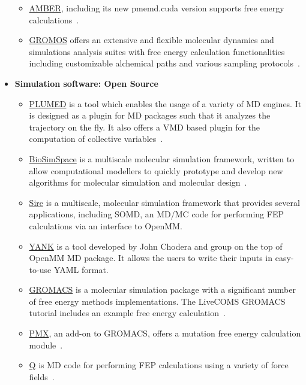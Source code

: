 \documentclass[9pt,bestpractices,pubversion]{livecoms}
\begin{document}
\begin{itemize}
\begin{itemize}
	\item \href{https://ambermd.org/}{AMBER}, including its new pmemd.cuda version supports free energy calculations~\cite{salomon-ferrer2013overview}. 
	\item \href{http://www.gromos.net/}{GROMOS} offers an extensive and flexible molecular dynamics and simulations analysis suites with free energy calculation functionalities including customizable alchemical paths and various sampling protocols~\cite{schmid2012architecture, kunz2012new, eichenberger2011gromos}.
	\end{itemize}
\item [] \textbf{Simulation software: Open Source}
	\begin{itemize}
	\item \href{https://www.plumed.org/}{PLUMED} is a tool which enables the usage of a variety of MD engines. It is designed as a plugin for MD packages such that it analyzes the trajectory on the fly. It also offers a VMD based plugin for the computation of collective variables~\cite{bonomi2019promoting}.   	
	\item \href{https://biosimspace.org/}{BioSimSpace} is a multiscale molecular simulation framework, written to allow computational modellers to quickly prototype and develop new algorithms for molecular simulation and molecular design~\cite{hedges2019biosimspace}. 
	\item \href{https://siremol.org/}{Sire} is a multiscale, molecular simulation framework that provides several applications, including SOMD, an MD/MC code for performing FEP calculations via an interface to OpenMM. 
	\item \href{http://getyank.org/latest/index.html}{YANK} is a tool developed by John Chodera and group on the top of OpenMM MD package. It allows the users to write their inputs in easy-to-use YAML format.
	\item \href{http://www.gromacs.org/}{GROMACS} is a molecular simulation package with a significant number of free energy methods implementations. The LiveCOMS GROMACS tutorial includes an example free energy calculation~\cite{lemkul2018From}.
	\item \href{http://pmx.mpibpc.mpg.de/instructions.html}{PMX}, an add-on to GROMACS, offers a mutation free energy calculation module~\cite{abraham2015gromacs}.
	\item \href{https://github.com/qusers/Q6}{Q} is MD code for performing FEP calculations using a variety of force fields~\cite{aaquist2017q6}. 
	\end{itemize}

\end{itemize}
\end{document}
